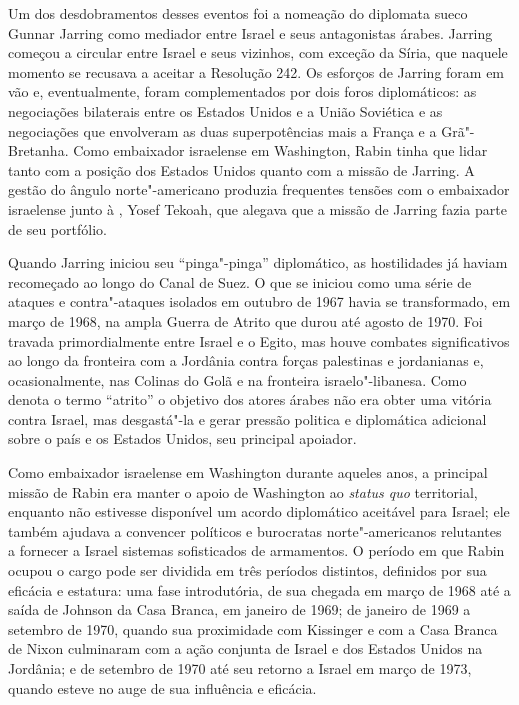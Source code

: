 Um dos desdobramentos desses eventos foi a nomeação do diplomata sueco
Gunnar Jarring como mediador entre Israel e seus antagonistas árabes.
Jarring começou a circular entre Israel e seus vizinhos, com exceção da
Síria, que naquele momento se recusava a aceitar a Resolução 242. Os
esforços de Jarring foram em vão e, eventualmente, foram complementados
por dois foros diplomáticos: as negociações bilaterais entre os Estados
Unidos e a União Soviética e as negociações que envolveram as duas
superpotências mais a França e a Grã"-Bretanha. Como embaixador
israelense em Washington, Rabin tinha que lidar tanto com a posição dos
Estados Unidos quanto com a missão de Jarring. A gestão do ângulo norte"-americano
produzia frequentes tensões com o embaixador israelense junto à ,
Yosef Tekoah, que alegava que a missão de Jarring fazia parte de seu
portfólio.

Quando Jarring iniciou seu ``pinga"-pinga'' diplomático, as hostilidades
já haviam recomeçado ao longo do Canal de Suez. O que se iniciou como
uma série de ataques e contra"-ataques isolados em outubro de 1967 havia
se transformado, em março de 1968, na ampla Guerra de Atrito que
durou até agosto de 1970. Foi travada primordialmente entre Israel e o
Egito, mas houve combates significativos ao longo da fronteira com a
Jordânia contra forças palestinas e jordanianas e, ocasionalmente, nas
Colinas do Golã e na fronteira israelo"-libanesa. Como denota o termo
``atrito'' o objetivo dos atores árabes não era obter uma vitória contra
Israel, mas desgastá"-la e gerar pressão politica e diplomática adicional
sobre o país e os Estados Unidos, seu principal apoiador.

Como embaixador israelense em Washington durante aqueles anos, a
principal missão de Rabin era manter o apoio de Washington ao
\emph{status quo} territorial, enquanto não estivesse disponível um
acordo diplomático aceitável para Israel; ele também ajudava a convencer
políticos e burocratas norte"-americanos relutantes a fornecer a Israel
sistemas sofisticados de armamentos. O período em que Rabin ocupou o cargo pode ser
dividida em três períodos distintos, definidos por sua eficácia e
estatura: uma fase introdutória, de sua chegada em março de 1968 até a
saída de Johnson da Casa Branca, em janeiro de 1969; de janeiro de 1969 a
setembro de 1970, quando sua proximidade com Kissinger e com a Casa
Branca de Nixon culminaram com a ação conjunta de Israel e dos Estados Unidos na
Jordânia; e de setembro de 1970 até seu retorno a Israel em março de
1973, quando esteve no auge de sua influência e eficácia.

